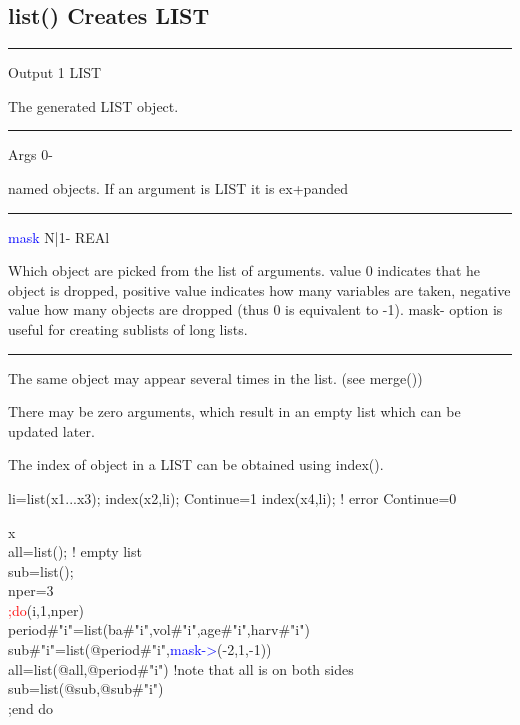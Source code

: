 \subsection{\textcolor{VioletRed}{list}() Creates LIST}
\label{list}
\vspace{0.3cm}
\hrule
\vspace{0.3cm}
\noindent Output \tabto{3cm}  1 \tabto{5cm}   LIST  \tabto{7cm}
\begin{changemargin}{3cm}{0cm}
\noindent The generated LIST object.
\end{changemargin}
\vspace{0.3cm}
\hrule
\vspace{0.3cm}
\noindent Args \tabto{3cm}  0-  \tabto{5cm}     \tabto{7cm}
\begin{changemargin}{3cm}{0cm}
\noindent  named objects. If an argument is LIST it is ex+panded
\end{changemargin}
\vspace{0.3cm}
\hrule
\vspace{0.3cm}
\noindent \textcolor{blue}{mask} \tabto{3cm}  N|1-  \tabto{5cm}  REAl \tabto{7cm}
\begin{changemargin}{3cm}{0cm}
\noindent  Which object are picked from the list of arguments.
value 0 indicates that
he object is dropped, positive value indicates how many variables are taken,
negative value how many objects are dropped (thus 0 is equivalent to -1). mask-
option is useful for creating sublists of long lists.
\end {changemargin}
\hrule
\vspace{0.2cm}
\begin{note}
The same object may appear several times in the list. (see \textcolor{VioletRed}{merge}())
\end{note}
\begin{note}
There may be zero arguments, which result in an empty list
which can be updated later.
\end{note}
\begin{note}
The index of object in a LIST can be obtained using \textcolor{VioletRed}{index}().
\end{note}
li=\textcolor{VioletRed}{list}(x1...x3);
\textcolor{VioletRed}{index}(x2,li);
Continue=1
\textcolor{VioletRed}{index}(x4,li);  ! error
Continue=0


\begin{example}[list2ex]x\\
\label{list2ex}
all=\textcolor{VioletRed}{list}();  ! empty list\\
sub=\textcolor{VioletRed}{list}();\\
nper=3\\
\textcolor{Red}{;do}(i,1,nper)\\
period\#"i"=\textcolor{VioletRed}{list}(ba\#"i",vol\#"i",age\#"i",harv\#"i")\\
sub\#"i"=\textcolor{VioletRed}{list}(@period\#"i",\textcolor{blue}{mask->}(-2,1,-1))\\
all=\textcolor{VioletRed}{list}(@all,@period\#"i") !note that all is on both sides\\
sub=\textcolor{VioletRed}{list}(@sub,@sub\#"i")\\
;end do
\end{example}

